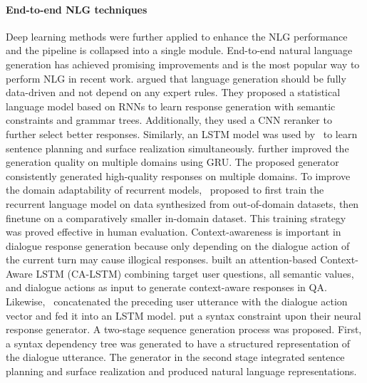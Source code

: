 \paragraph*{End-to-end NLG techniques} Deep learning methods were further applied to enhance the NLG performance and the pipeline is collapsed into a single module. End-to-end natural language generation has achieved promising improvements and is the most popular way to perform NLG in recent work.  argued that language generation should be fully data-driven and not depend on any expert rules. They proposed a statistical language model based on RNNs to learn response generation with semantic constraints and grammar trees. Additionally, they used a CNN reranker to further select better responses. Similarly, an LSTM model was used by~ to learn sentence planning and surface realization simultaneously.  further improved the generation quality on multiple domains using GRU. The proposed generator consistently generated high-quality responses on multiple domains. To improve the domain adaptability of recurrent models,~ proposed to first train the recurrent language model on data synthesized from out-of-domain datasets, then finetune on a comparatively smaller in-domain dataset. This training strategy was proved effective in human evaluation. Context-awareness is important in dialogue response generation because only depending on the dialogue action of the current turn may cause illogical responses.  built an attention-based Context-Aware LSTM (CA-LSTM) combining target user questions, all semantic values, and dialogue actions as input to generate context-aware responses in QA. Likewise,~ concatenated the preceding user utterance with the dialogue action vector and fed it into an LSTM model.  put a syntax constraint upon their neural response generator. A two-stage sequence generation process was proposed. First, a syntax dependency tree was generated to have a structured representation of the dialogue utterance. The generator in the second stage integrated sentence planning and surface realization and produced natural language representations. 
